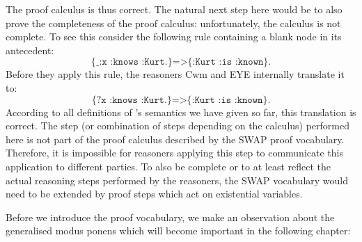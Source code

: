 The proof calculus is thus correct. %
The natural next step here would be to also prove the completeness of the proof calculus: unfortunately, the calculus is not complete.
% 
To see this consider the following rule containing a blank node in its antecedent:
\[
 \texttt{\{\_:x :knows :Kurt.\}=>\{:Kurt :is :known\}.}
\]
Before they apply this rule, the reasoners Cwm and EYE internally translate it to:
\[
 \texttt{\{?x :knows :Kurt.\}=>\{:Kurt :is :known\}.}
\]
According to all definitions of \nthree's semantics we have given so far, this translation is correct. The step (or combination of steps depending on the calculus) 
performed here is not part of the proof calculus described by the SWAP
proof vocabulary. Therefore, it is impossible for reasoners applying this step to communicate this application to different parties. To also be complete or to at least reflect the actual 
reasoning steps performed by the reasoners, the SWAP vocabulary would need to be extended by proof steps which act on existential variables.

Before we introduce the proof vocabulary, we make an observation about the generalised modus ponens which will become important in the following chapter:
% 

